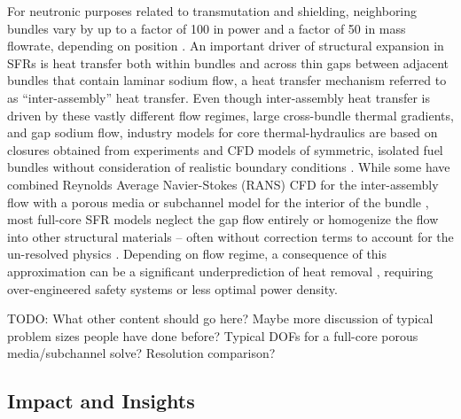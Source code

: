 \documentclass[11pt,letterpaper,english]{article}
\begin{document}
For neutronic purposes related to transmutation and shielding, neighboring bundles vary by up to a factor of 100 in power and a factor of 50 in mass flowrate, depending on position \cite{abr}. An important driver of structural expansion in SFRs is heat transfer both within bundles and across thin gaps between adjacent bundles that contain laminar sodium flow, a heat transfer mechanism referred to as ``inter-assembly'' heat transfer. Even though inter-assembly heat transfer is driven by these vastly different flow regimes, large cross-bundle thermal gradients, and gap sodium flow, industry models for core thermal-hydraulics are based on closures obtained from experiments and CFD models of symmetric, isolated fuel bundles without consideration of realistic boundary conditions \cite{touran}. While some have combined Reynolds Average Navier-Stokes (RANS) CFD for the inter-assembly flow with a porous media or subchannel model for the interior of the bundle \cite{wang2020,gerschenfeld}, most full-core SFR models neglect the gap flow entirely \cite{touran} or homogenize the flow into other structural materials \cite{fiorina_of} -- often without correction terms to account for the un-resolved physics \cite{touran,fiorina_of}. Depending on flow regime, a consequence of this approximation can be a significant underprediction of heat removal \cite{gerschenfeld}, requiring over-engineered safety systems or less optimal power density.


TODO: What other content should go here? Maybe more discussion of typical problem sizes people have done before? Typical DOFs for a full-core porous media/subchannel solve? Resolution comparison?






\vspace{-.25in}
\subsection{Impact and Insights}
\vspace{-.2in}
\end{document}
